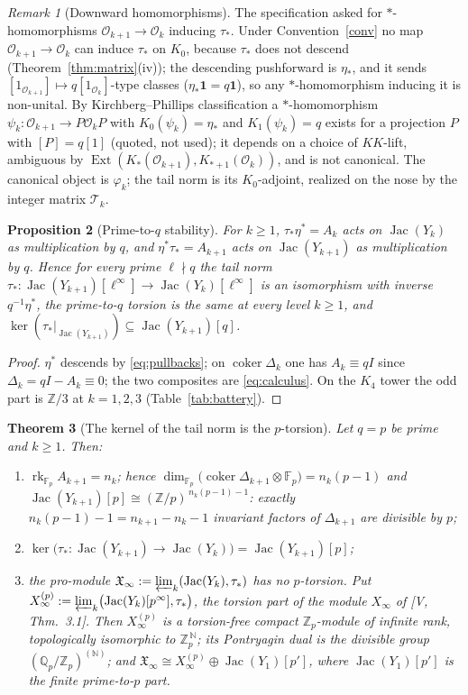 \documentclass[11pt]{amsart}
\numberwithin{equation}{section}
\newtheorem{theorem}{Theorem}[section]
\newtheorem{proposition}[theorem]{Proposition}
\theoremstyle{definition}
\theoremstyle{remark}
\newtheorem{remark}[theorem]{Remark}
\newcommand{\Z}{\mathbb{Z}}
\newcommand{\Q}{\mathbb{Q}}
\newcommand{\F}{\mathbb{F}}
\newcommand{\Zp}{\Z_p}
\newcommand{\Qp}{\Q_p}
\newcommand{\cO}{\mathcal{O}}
\newcommand{\cT}{\mathcal{T}}
\newcommand{\XX}{\mathfrak{X}_\infty}
\newcommand{\Jac}{\operatorname{Jac}}
\newcommand{\coker}{\operatorname{coker}}
\newcommand{\Ext}{\operatorname{Ext}}
\newcommand{\rk}{\operatorname{rk}}
\newcommand{\ta}{\tau_*}
\newcommand{\et}{\eta_*}
\newcommand{\etp}{\eta^*}
\newcommand{\Tdn}{\cT_{k}}
\begin{document}
\begin{remark}[Downward homomorphisms]\label{rem:down}
The specification asked for $*$-homomorphisms $\cO_{k+1}\to\cO_k$ inducing $\ta$. Under
Convention~\ref{conv} no map $\cO_{k+1}\to\cO_k$ can induce $\ta$ on $K_0$, because $\ta$
does not descend (Theorem~\ref{thm:matrix}(iv)); the descending pushforward is $\et$,
and it sends $[1_{\cO_{k+1}}]\mapsto q[1_{\cO_k}]$-type classes ($\et\mathbf1=q\mathbf1$),
so any $*$-homomorphism inducing it is non-unital. By Kirchberg--Phillips
classification \cite{Ph} a $*$-homomorphism $\psi_k\colon\cO_{k+1}\to P\cO_kP$ with
$K_0(\psi_k)=\et$ and $K_1(\psi_k)=q$ exists for a projection $P$ with
$[P]=q[1]$ (quoted, not used); it depends on a choice of $KK$-lift, ambiguous by
$\Ext(K_*(\cO_{k+1}),K_{*+1}(\cO_k))$, and is not canonical. The canonical object is
$\varphi_k$; the tail norm is its $K_0$-adjoint, realized on the nose by the integer
matrix $\Tdn$.
\end{remark}

\begin{proposition}[Prime-to-$q$ stability]\label{prop:stable}
For $k\ge1$, $\ta\etp=A_k$ acts on $\Jac(Y_k)$ as multiplication by $q$, and
$\etp\ta=A_{k+1}$ acts on $\Jac(Y_{k+1})$ as multiplication by $q$. Hence for every
prime $\ell\nmid q$ the tail norm $\ta\colon\Jac(Y_{k+1})[\ell^\infty]\to\Jac(Y_k)[\ell^\infty]$
is an isomorphism with inverse $q^{-1}\etp$, the prime-to-$q$ torsion is the same at
every level $k\ge1$, and $\ker(\ta|_{\Jac(Y_{k+1})})\subseteq\Jac(Y_{k+1})[q]$.
\end{proposition}

\begin{proof}
$\etp$ descends by \eqref{eq:pullbacks}; on $\coker\Delta_k$ one has $A_k\equiv qI$
since $\Delta_k=qI-A_k\equiv0$; the two composites are \eqref{eq:calculus}. On the
$K_4$ tower the odd part is $\Z/3$ at $k=1,2,3$ (Table~\ref{tab:battery}).
\end{proof}

\begin{theorem}[The kernel of the tail norm is the $p$-torsion]\label{thm:ptorsion}
Let $q=p$ be prime and $k\ge1$. Then:
\begin{enumerate}
\item[(i)] $\rk_{\F_p}A_{k+1}=n_k$; hence $\dim_{\F_p}\bigl(\coker\Delta_{k+1}\otimes\F_p\bigr)=n_k(p-1)$
and $\Jac(Y_{k+1})[p]\cong(\Z/p)^{\,n_k(p-1)-1}$: exactly $n_k(p-1)-1=n_{k+1}-n_k-1$
invariant factors of $\Delta_{k+1}$ are divisible by $p$;
\item[(ii)] $\ker\bigl(\ta\colon\Jac(Y_{k+1})\to\Jac(Y_k)\bigr)=\Jac(Y_{k+1})[p]$;
\item[(iii)] the pro-module $\XX:=\varprojlim_k(\Jac(Y_k),\ta)$ has no $p$-torsion. Put
$X_\infty^{(p)}:=\varprojlim_k\bigl(\Jac(Y_k)[p^\infty],\ta\bigr)$, the torsion part of
the module $X_\infty$ of {\rm[V, Thm.~3.1]}. Then $X_\infty^{(p)}$ is a torsion-free
compact $\Zp$-module of infinite rank, topologically isomorphic to $\Zp^{\,\mathbb N}$;
its Pontryagin dual is the divisible group $(\Qp/\Zp)^{(\mathbb N)}$; and
$\XX\cong X_\infty^{(p)}\oplus\Jac(Y_1)[p']$, where $\Jac(Y_1)[p']$ is the finite
prime-to-$p$ part.
\end{enumerate}
\end{theorem}
\end{document}
